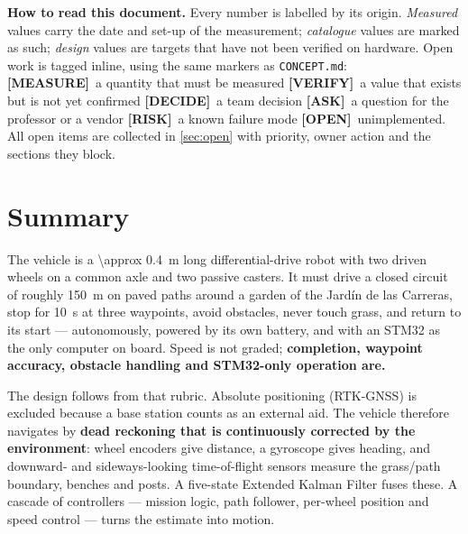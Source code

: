 \documentclass[11pt,a4paper]{article}
\newcommand{\mk}[2]{\textsf{\scriptsize\bfseries\colorbox{#1bg}{\color{#1}[#2]}}}
\newcommand{\MEASURE}{\mk{warn}{MEASURE}}
\newcommand{\VERIFY}{\mk{cold}{VERIFY}}
\newcommand{\DECIDE}{\mk{accent}{DECIDE}}
\newcommand{\ASK}{\mk{good}{ASK}}
\newcommand{\RISK}{\mk{bad}{RISK}}
\newcommand{\OPEN}{\mk{grey}{OPEN}}
\newcommand{\code}[1]{\texttt{\small #1}}
\begin{document}
\begin{titlepage}
\vfill
\begin{coldbox}
\small\textbf{How to read this document.} Every number is labelled by its origin.
\emph{Measured} values carry the date and set-up of the measurement;
\emph{catalogue} values are marked as such; \emph{design} values are targets that
have not been verified on hardware. Open work is tagged inline, using the same
markers as \code{CONCEPT.md}:\\[1mm]
\MEASURE\ a quantity that must be measured \quad
\VERIFY\ a value that exists but is not yet confirmed \quad
\DECIDE\ a team decision \quad
\ASK\ a question for the professor or a vendor \quad
\RISK\ a known failure mode \quad
\OPEN\ unimplemented.\\[1mm]
All open items are collected in \cref{sec:open} with priority, owner action and
the sections they block.
\end{coldbox}
\end{titlepage}

\tableofcontents
\clearpage

\section*{Summary}

The vehicle is a \qty{\approx 0.4}{m} long differential-drive robot with two
driven wheels on a common axle and two passive casters. It must drive a closed
circuit of roughly \qty{150}{m} on paved paths around a garden of the Jard\'in de
las Carreras, stop for \qty{10}{s} at three waypoints, avoid obstacles, never
touch grass, and return to its start --- autonomously, powered by its own
battery, and with an STM32 as the only computer on board. Speed is not graded;
\textbf{completion, waypoint accuracy, obstacle handling and STM32-only operation
are.}

The design follows from that rubric. Absolute positioning (RTK-GNSS) is excluded
because a base station counts as an external aid. The vehicle therefore navigates
by \textbf{dead reckoning that is continuously corrected by the environment}:
wheel encoders give distance, a gyroscope gives heading, and downward- and
sideways-looking time-of-flight sensors measure the grass/path boundary, benches
and posts. A five-state Extended Kalman Filter fuses these. A cascade of
controllers --- mission logic, path follower, per-wheel position and speed
control --- turns the estimate into motion.
\end{document}
